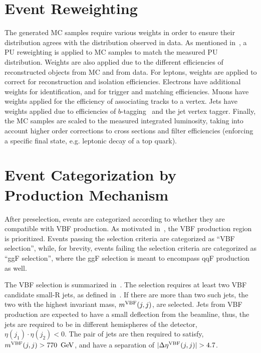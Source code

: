 %
\section{Event Reweighting}
The generated MC samples require various weights in order to ensure their distribution agrees with the distribution observed in data. As mentioned in~\Sect{\ref{ch:analysisStrategy:sig_bkg_model}}, a PU reweighting is applied to MC samples to match the measured PU distribution. Weights are also applied due to the different efficiencies of reconstructed objects from MC and from data. For leptons, weights are applied to correct for reconstruction and isolation efficiencies. Electrons have additional weights for identification, and for trigger and matching efficiencies. Muons have weights applied for the efficiency of associating tracks to a vertex. Jets have weights applied due to efficiencies of $b$-tagging~\cite{b_jet} and the jet vertex tagger. Finally, the MC samples are scaled to the measured integrated luminosity, taking into account higher order corrections to cross sections and filter efficiencies (enforcing a specific final state, e.g. leptonic decay of a top quark).

%
\section{Event Categorization by Production Mechanism}
After preselection, events are categorized according to whether they are compatible with VBF production. As motivated in~\Sect{\ref{ch:evt_sel:sig_eff}}, the VBF production region is prioritized.  Events passing the selection criteria are categorized as ``VBF selection'', while, for brevity, events failing the selection criteria are categorized as ``ggF selection'', where the ggF selection is meant to encompass qqF production as well. 

The VBF selection is summarized in~\Tab{\ref{tab:vbf_sel}}. The selection requires at least two VBF candidate small-R jets, as defined in~\Sect{\ref{ch:objectReconstruction:smallr}}. If there are more than two such jets, the two with the highest invariant mass, $m^{\rm VBF}(j,j)$, are selected. Jets from VBF production are expected to have a small deflection from the beamline, thus, the jets are required to be in different hemispheres of the detector, $\eta(j_1)\cdot\eta(j_2)<0$.  The pair of jets are then required to satisfy, $m^{\rm VBF}(j,j)>770\,\GeV$, and have a separation of $|\Delta\eta^{\rm VBF}(j,j)|>4.7$.  

